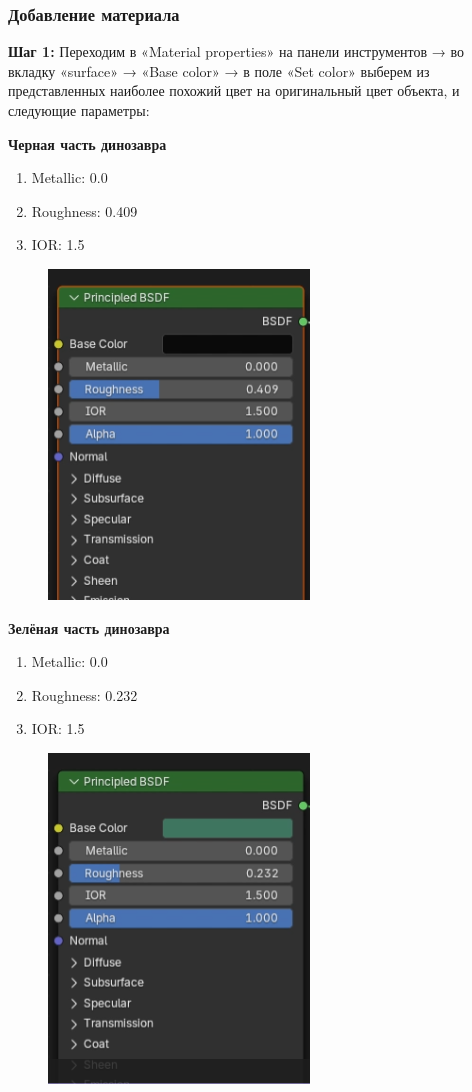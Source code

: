 \documentclass[areasetadvanced]{scrartcl}
\begin{document}
\subsubsection{Добавление материала}
\par \textbf{Шаг 1:} Переходим в «Material properties» на панели инструментов → во вкладку «surface» → «Base color» → в поле «Set color» выберем из представленных наиболее похожий цвет на оригинальный цвет объекта, и следующие параметры:

\par \textbf{Черная часть динозавра}
\begin{enumerate}
    \item Metallic: 0.0
    \item Roughness: 0.409
    \item IOR: 1.5
\end{enumerate}

\begin{figure}[H]
    \label{4} 
    \centering
    \includegraphics[width=0.4\linewidth]{dino/14.png}
\end{figure}

\par \textbf{Зелёная часть динозавра}
\begin{enumerate}
    \item Metallic: 0.0
    \item Roughness: 0.232
    \item IOR: 1.5
\end{enumerate}

\begin{figure}[H]
    \label{4} 
    \centering
    \includegraphics[width=0.4\linewidth]{dino/15.png}
\end{figure}
\end{document}
